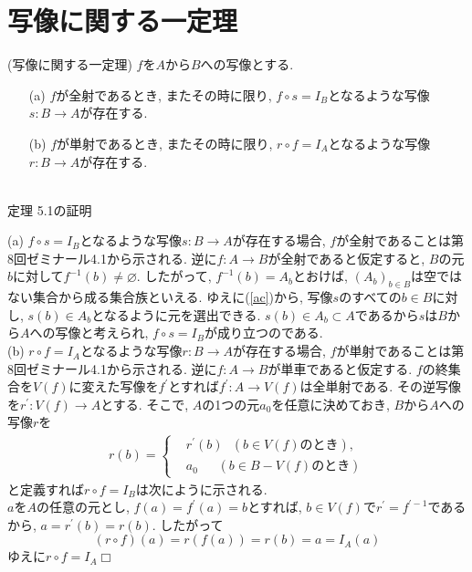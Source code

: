 \documentclass[a4j]{jsarticle}
\def \QED{\hfill $\Box$}%
\begin{document}
\section{写像に関する一定理}

\begin{itembox}[l]{ (写像に関する一定理)}
  $f$を$A$から$B$への写像とする.
  \begin{itemize}
    \item[(a)] $f$が全射であるとき, またその時に限り, $f \circ s = I_B$となるような写像$s : B \rightarrow A$が存在する.
    \item[(b)] $f$が単射であるとき, またその時に限り, $r \circ f = I_A$となるような写像$r : B \rightarrow A$が存在する.
  \end{itemize}
\end{itembox}\\

 定理 5.1の証明

(a) $f \circ s = I_B$となるような写像$s : B \rightarrow A$が存在する場合, $f$が全射であることは第8回ゼミナール4.1から示される. 逆に$f : A \rightarrow B$が全射であると仮定すると, $B$の元$b$に対して$f^{-1}(b) \neq \varnothing$. したがって, $f^{-1}(b) = A_b$とおけば, $(A_b)_{b \in B}$は空ではない集合から成る集合族といえる. ゆえに(\ref{ac})から, 写像$s$のすべての$b \in B$に対し, $s(b) \in A_b$となるように元を選出できる. $s(b) \in A_b \subset A$であるから$s$は$B$から$A$への写像と考えられ, $f \circ s = I_B$が成り立つのである. \\

(b) $r \circ f = I_A$となるような写像$r : B \rightarrow A$が存在する場合, $f$が単射であることは第8回ゼミナール4.1から示される. 逆に$f : A \rightarrow B$が単車であると仮定する. $f$の終集合を$V(f)$に変えた写像を$f^\prime$とすれば$f^\prime : A \rightarrow V(f)$は全単射である. その逆写像を$r^\prime : V(f) \rightarrow A$とする. そこで, $A$の1つの元$a_0$を任意に決めておき, $B$から$A$への写像$r$を
\begin{align*}
  r(b) =  \begin{cases}
             & r^\prime(b)\:\:\:(b \in V(f)\mbox{のとき}),    \\
             & a_0\:\:\:\:\:\:\:(b \in B - V(f)\mbox{のとき})
          \end{cases}
\end{align*}
と定義すれば$r \circ f = I_B$は次にように示される. \\
$a$を$A$の任意の元とし, $f(a)=f^\prime(a)=b$とすれば, $b \in V(f)$で$r^\prime = f^{\prime-1}$であるから, $a=r^\prime(b)=r(b)$. したがって$$(r \circ f)(a) = r(f(a)) = r(b) = a = I_A(a)$$ゆえに$r \circ f = I_A$\QED\\
\end{document}

